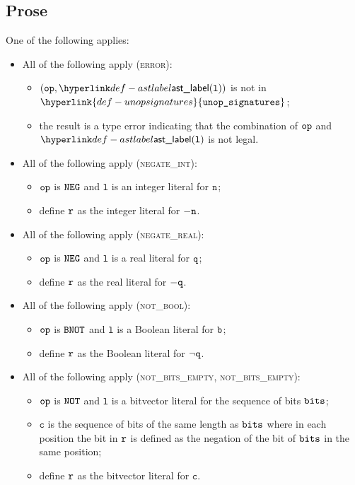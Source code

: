 \documentclass{book}
\newcommand\unopsignatures[0]{\hyperlink{def-unopsignatures}{\texttt{unop\_signatures}}}
\newcommand\vc[0]{\texttt{c}}
\newcommand\vl[0]{\texttt{l}}
\begin{document}
\subsection{Prose}
One of the following applies:
\begin{itemize}
  \item All of the following apply (\textsc{error}):
  \begin{itemize}
    \item $(\op, \astlabel(\vl))$ is not in $\unopsignatures$;
    \item the result is a type error indicating that the combination of $\texttt{op}$ and $\astlabel(\vl)$
          is not legal.
  \end{itemize}

  \item All of the following apply (\textsc{negate\_int}):
  \begin{itemize}
    \item $\texttt{op}$ is $\texttt{NEG}$ and $\vl$ is an integer literal for $\texttt{n}$;
    \item define $\texttt{r}$ as the integer literal for $- \texttt{n}$.
  \end{itemize}

  \item All of the following apply (\textsc{negate\_real}):
  \begin{itemize}
    \item $\texttt{op}$ is $\texttt{NEG}$ and $\vl$ is a real literal for $\texttt{q}$;
    \item define $\texttt{r}$ as the real literal for $- \texttt{q}$.
  \end{itemize}

  \item All of the following apply (\textsc{not\_bool}):
  \begin{itemize}
    \item $\texttt{op}$ is $\texttt{BNOT}$ and $\vl$ is a Boolean literal for $\texttt{b}$;
    \item define $\texttt{r}$ as the Boolean literal for $\neg\texttt{q}$.
  \end{itemize}

  \item All of the following apply (\textsc{not\_bits\_empty}, \textsc{not\_bits\_empty}):
  \begin{itemize}
    \item $\texttt{op}$ is $\texttt{NOT}$ and $\vl$ is a bitvector literal for the sequence of bits $\texttt{bits}$;
    \item $\vc$ is the sequence of bits of the same length as $\texttt{bits}$ where in each position
          the bit in $\texttt{r}$ is defined as the negation of the bit of $\texttt{bits}$ in the same position;
    \item define $\texttt{r}$ as the bitvector literal for $\vc$.
  \end{itemize}
\end{itemize}
\end{document}
